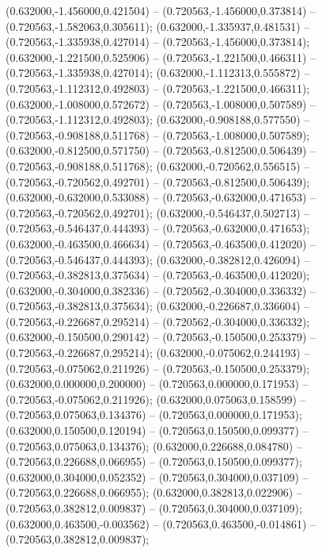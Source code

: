  (0.632000,-1.456000,0.421504) -- (0.720563,-1.456000,0.373814) -- (0.720563,-1.582063,0.305611);
 (0.632000,-1.335937,0.481531) -- (0.720563,-1.335938,0.427014) -- (0.720563,-1.456000,0.373814);
 (0.632000,-1.221500,0.525906) -- (0.720563,-1.221500,0.466311) -- (0.720563,-1.335938,0.427014);
 (0.632000,-1.112313,0.555872) -- (0.720563,-1.112312,0.492803) -- (0.720563,-1.221500,0.466311);
 (0.632000,-1.008000,0.572672) -- (0.720563,-1.008000,0.507589) -- (0.720563,-1.112312,0.492803);
 (0.632000,-0.908188,0.577550) -- (0.720563,-0.908188,0.511768) -- (0.720563,-1.008000,0.507589);
 (0.632000,-0.812500,0.571750) -- (0.720563,-0.812500,0.506439) -- (0.720563,-0.908188,0.511768);
 (0.632000,-0.720562,0.556515) -- (0.720563,-0.720562,0.492701) -- (0.720563,-0.812500,0.506439);
 (0.632000,-0.632000,0.533088) -- (0.720563,-0.632000,0.471653) -- (0.720563,-0.720562,0.492701);
 (0.632000,-0.546437,0.502713) -- (0.720563,-0.546437,0.444393) -- (0.720563,-0.632000,0.471653);
 (0.632000,-0.463500,0.466634) -- (0.720563,-0.463500,0.412020) -- (0.720563,-0.546437,0.444393);
 (0.632000,-0.382812,0.426094) -- (0.720563,-0.382813,0.375634) -- (0.720563,-0.463500,0.412020);
 (0.632000,-0.304000,0.382336) -- (0.720562,-0.304000,0.336332) -- (0.720563,-0.382813,0.375634);
 (0.632000,-0.226687,0.336604) -- (0.720563,-0.226687,0.295214) -- (0.720562,-0.304000,0.336332);
 (0.632000,-0.150500,0.290142) -- (0.720563,-0.150500,0.253379) -- (0.720563,-0.226687,0.295214);
 (0.632000,-0.075062,0.244193) -- (0.720563,-0.075062,0.211926) -- (0.720563,-0.150500,0.253379);
 (0.632000,0.000000,0.200000) -- (0.720563,0.000000,0.171953) -- (0.720563,-0.075062,0.211926);
 (0.632000,0.075063,0.158599) -- (0.720563,0.075063,0.134376) -- (0.720563,0.000000,0.171953);
 (0.632000,0.150500,0.120194) -- (0.720563,0.150500,0.099377) -- (0.720563,0.075063,0.134376);
 (0.632000,0.226688,0.084780) -- (0.720563,0.226688,0.066955) -- (0.720563,0.150500,0.099377);
 (0.632000,0.304000,0.052352) -- (0.720563,0.304000,0.037109) -- (0.720563,0.226688,0.066955);
 (0.632000,0.382813,0.022906) -- (0.720563,0.382812,0.009837) -- (0.720563,0.304000,0.037109);
 (0.632000,0.463500,-0.003562) -- (0.720563,0.463500,-0.014861) -- (0.720563,0.382812,0.009837);
